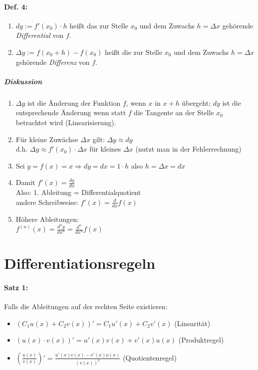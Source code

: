 \paragraph{Def. 4:} 
\begin{enumerate}[label=\alph*.)]
\item $dy:= f'(x_0)\cdot h$ heißt das zur Stelle $x_0$ und dem Zuwachs $h=\Delta x$ gehörende \emph{Differential} von $f$.
\item $\Delta y := f(x_0+h)-f(x_0)$ heißt die zur Stelle $x_0$ und dem Zuwachs $h=\Delta x$ gehörende \emph{Differenz} von $f$.
\end{enumerate}
\subparagraph{Diskussion}
\begin{enumerate}
\item $\Delta y$ ist die Änderung der Funktion $f$, wenn $x$ in $x+h$ übergeht; $dy$ ist die entsprechende Änderung wenn statt $f$ die Tangente an der Stelle $x_0$ betrachtet wird (Linearisierung).
\item Für kleine Zuwächse $\Delta x$ gilt: $\Delta y \approx dy$\\
d.h. $\Delta y \approx f'(x_0)\cdot \Delta x$ für kleines $\Delta x$ (nutzt man in der Fehlerrechnung)
\item Sei $y=f(x)=x \Rightarrow dy=dx=1\cdot h$ also $\boxed{h=\Delta x = dx}$
\item Damit $f'(x)=\frac{dy}{dx}$\\
Also: 1. Ableitung = Differentialquotient\\
andere Schreibweise: $f'(x)=\frac{d}{dx}f(x)$
\item Höhere Ableitungen:\\
$f^{(n)}(x)=\frac{d^n y}{dx^n}=\frac{d^n}{dx^n}f(x)$
\end{enumerate}
\section{Differentiationsregeln}
\paragraph{Satz 1:} Falls die Ableitungen auf der rechten Seite existieren:
\begin{itemize}
\item $(C_1 u(x)+C_2 v(x))' = C_1 u'(x)+C_2 v'(x)$ (Linearität)
\item $(u(x) \cdot v(x))' = u'(x)v(x)+v'(x)u(x)$ (Produktregel)
\item $\left( \frac{u(x)}{v(x)}\right)' = \frac{u'(x)v(x)-v'(x)u(x)}{(v(x))^2}$ (Quotientenregel)
\end{itemize}

